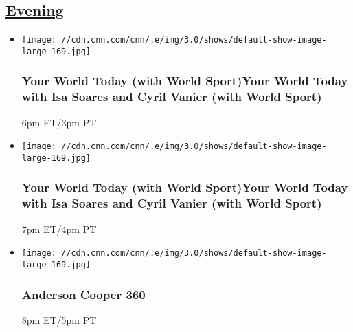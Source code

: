 \hypertarget{evening--3}{%
\subsection{\texorpdfstring{\href{/tv/schedule/cnn/index.html}{Evening}~}{Evening~}}\label{evening--3}}

\begin{itemize}
\item
  \texttt{[image: //cdn.cnn.com/cnn/.e/img/3.0/shows/default-show-image-large-169.jpg]}

  \hypertarget{your-world-today-with-world-sportyour-world-today-with-isa-soares-and-cyril-vanier-with-world-sport--2}{%
  \subsubsection{Your World Today (with World Sport)Your World Today
  with Isa Soares and Cyril Vanier (with World Sport)
  }\label{your-world-today-with-world-sportyour-world-today-with-isa-soares-and-cyril-vanier-with-world-sport--2}}

  6pm ET/3pm PT
\end{itemize}

\begin{itemize}
\item
  \texttt{[image: //cdn.cnn.com/cnn/.e/img/3.0/shows/default-show-image-large-169.jpg]}

  \hypertarget{your-world-today-with-world-sportyour-world-today-with-isa-soares-and-cyril-vanier-with-world-sport--3}{%
  \subsubsection{Your World Today (with World Sport)Your World Today
  with Isa Soares and Cyril Vanier (with World Sport)
  }\label{your-world-today-with-world-sportyour-world-today-with-isa-soares-and-cyril-vanier-with-world-sport--3}}

  7pm ET/4pm PT
\end{itemize}

\begin{itemize}
\item
  \texttt{[image: //cdn.cnn.com/cnn/.e/img/3.0/shows/default-show-image-large-169.jpg]}

  \hypertarget{anderson-cooper-360-1}{%
  \subsubsection{Anderson Cooper 360}\label{anderson-cooper-360-1}}

  8pm ET/5pm PT
\end{itemize}

